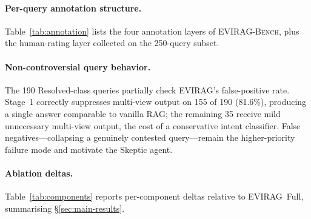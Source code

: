 \documentclass[11pt]{article}
\newcommand{\system}{\textsc{EVIRAG}\xspace}
\newcommand{\bench}{\textsc{EVIRAG-Bench}\xspace}
\begin{document}
\paragraph{Per-query annotation structure.}
Table~\ref{tab:annotation} lists the four annotation layers of \bench,
plus the human-rating layer collected on the 250-query subset.

\begin{table}[h]
\centering\small
\setlength{\tabcolsep}{3pt}
%
\caption{Per-query annotation structure in \bench.  Annotations were
finalized and version-locked before any system was run, preventing
coupling between evaluation outcomes and annotation choices.}
\label{tab:annotation}
\end{table}

\paragraph{Non-controversial query behavior.}
The 190 Resolved-class queries partially check \system's false-positive rate.
Stage~1 correctly suppresses multi-view output on 155 of 190 (81.6\%),
producing a single answer comparable to vanilla RAG; the remaining 35 receive
mild unnecessary multi-view output, the cost of a conservative intent
classifier.  False negatives---collapsing a genuinely contested query---remain
the higher-priority failure mode and motivate the Skeptic agent.

\paragraph{Ablation deltas.}
Table~\ref{tab:components} reports per-component deltas relative to
\system\ Full, summarising \S\ref{sec:main-results}.
\end{document}
